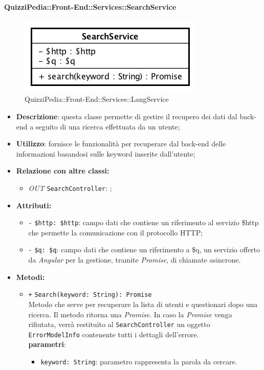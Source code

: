 \paragraph{QuizziPedia::Front-End::Services::SearchService}
\begin{figure}[ht]
	\centering
	\includegraphics[scale=0.60]{UML/Classi/Front-End/QuizziPedia_Front-end_Services_SearchService.png}
	\caption{QuizziPedia::Front-End::Services::LangService}
\end{figure}\FloatBarrier
\begin{itemize}
	\item \textbf{Descrizione}: questa classe permette di gestire il recupero dei dati dal back-end a seguito di una ricerca effettuata da un utente;
	\item \textbf{Utilizzo}: fornisce le funzionalità per recuperare dal back-end delle informazioni basandosi sulle keyword inserite dall'utente;
	\item \textbf{Relazione con altre classi:}
	\begin{itemize}
		\item \textit{OUT} \texttt{SearchController}: ;
	\end{itemize}
	\item \textbf{Attributi:}
	\begin{itemize}
		\item \texttt{-} \texttt{\$http: \$http}: campo dati che contiene un riferimento al servizio \$http che permette la comunicazione con il protocollo HTTP;
		\item \texttt{-} \texttt{\$q: \$q}: campo dati che contiene un riferimento a \$q, un servizio offerto da \textit{Angular} per la gestione, tramite \textit{Promise}, di chiamate asincrone. 
	\end{itemize}
	\item \textbf{Metodi:}
	\begin{itemize}
		\item \texttt{+} \texttt{Search(keyword: String): Promise} \\Metodo che serve per recuperare la lista di utenti e questionari dopo una ricerca. Il metodo ritorna una \textit{Promise}. In caso la \textit{Promise} venga rifiutata, verrà restituito al \texttt{SearchController} un oggetto \texttt{ErrorModelInfo} contenente tutti i dettagli dell'errore. \\
		\textbf{parametri}:
		\begin{itemize}
			\item \texttt{keyword: String}: parametro rappresenta la parola da cercare.
		\end{itemize}
	\end{itemize}
\end{itemize}

